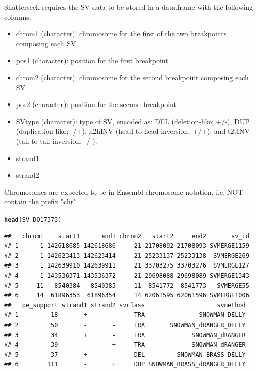 \documentclass[twoside,a4wide,11pt]{article}\usepackage[]{graphicx}\usepackage[]{color}
\makeatletter
\newcommand{\hlstd}[1]{\textcolor[rgb]{0.345,0.345,0.345}{#1}}%
\newcommand{\hlkwd}[1]{\textcolor[rgb]{0.737,0.353,0.396}{\textbf{#1}}}%
\newenvironment{kframe}{%
 \def\at@end@of@kframe{}%
 \ifinner\ifhmode%
  \def\at@end@of@kframe{\end{minipage}}%
  \begin{minipage}{\columnwidth}%
 \fi\fi%
 \def\FrameCommand##1{\hskip\@totalleftmargin \hskip-\fboxsep
 \colorbox{shadecolor}{##1}\hskip-\fboxsep
     \hskip-\linewidth \hskip-\@totalleftmargin \hskip\columnwidth}%
 \MakeFramed {\advance\hsize-\width
   \@totalleftmargin\z@ \linewidth\hsize
   \@setminipage}}%
 {\par\unskip\endMakeFramed%
 \at@end@of@kframe}
\newenvironment{knitrout}{}{} %
\makeatother
\begin{document}
Shatterseek requires the SV data to be stored in a data.frame with the following columns: 
\begin{itemize}
\item chrom1 (character): chromosome for the first of the two breakpoints composing each SV
\item pos1 (character): position for the first breakpoint
\item chrom2 (character): chromosome for the second breakpoint composing each SV
\item pos2 (character): position for the second breakpoint
\item SVtype (character): type of SV, encoded as: DEL (deletion-like; +/-), DUP (duplication-like; -/+),
h2hINV (head-to-head inversion; +/+), and t2tINV (tail-to-tail inversion; -/-).
\item strand1
\item strand2
\end{itemize}
Chromosomes are expected to be in Ensembl chromosome notation, i.e. NOT contain the prefix "chr".\\
\begin{knitrout}
\color{fgcolor}\begin{kframe}
\begin{alltt}
\hlkwd{head}\hlstd{(SV_DO17373)}
\end{alltt}
\begin{verbatim}
##   chrom1    start1      end1 chrom2   start2     end2       sv_id
## 1      1 142618685 142618686     21 21708092 21708093 SVMERGE1159
## 2      1 142623413 142623414     21 25233137 25233138  SVMERGE269
## 3      1 142639910 142639911     21 33703275 33703276  SVMERGE127
## 4      1 143536371 143536372     21 29698088 29698089 SVMERGE1343
## 5     11   8540384   8540385     11  8541772  8541773   SVMERGE55
## 6     14  61896353  61896354     14 62061595 62061596 SVMERGE1006
##   pe_support strand1 strand2 svclass                    svmethod
## 1         18       +       -     TRA               SNOWMAN_DELLY
## 2         50       -       -     TRA       SNOWMAN_dRANGER_DELLY
## 3         34       +       -     TRA             SNOWMAN_dRANGER
## 4         39       -       +     TRA             SNOWMAN_dRANGER
## 5         37       +       -     DEL         SNOWMAN_BRASS_DELLY
## 6        111       -       +     DUP SNOWMAN_BRASS_dRANGER_DELLY
\end{verbatim}
\end{kframe}
\end{knitrout}
\end{document}
